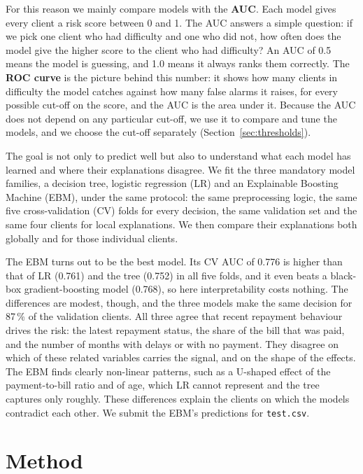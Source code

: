 \documentclass[a4paper,11pt]{article}
\begin{document}
For this reason we mainly compare models with the \textbf{AUC}. Each model gives every client a risk score between 0 and 1. The AUC answers a simple question: if we pick one client who had difficulty and one who did not, how often does the model give the higher score to the client who had difficulty? An AUC of 0.5 means the model is guessing, and 1.0 means it always ranks them correctly. The \textbf{ROC curve} is the picture behind this number: it shows how many clients in difficulty the model catches against how many false alarms it raises, for every possible cut-off on the score, and the AUC is the area under it. Because the AUC does not depend on any particular cut-off, we use it to compare and tune the models, and we choose the cut-off separately (Section~\ref{sec:thresholds}).

The goal is not only to predict well but also to understand what each model has learned and where their explanations disagree. We fit the three mandatory model families, a decision tree, logistic regression (LR) and an Explainable Boosting Machine (EBM), under the same protocol: the same preprocessing logic, the same five cross-validation (CV) folds for every decision, the same validation set and the same four clients for local explanations. We then compare their explanations both globally and for those individual clients.

The EBM turns out to be the best model. Its CV AUC of 0.776 is higher than that of LR (0.761) and the tree (0.752) in all five folds, and it even beats a black-box gradient-boosting model (0.768), so here interpretability costs nothing. The differences are modest, though, and the three models make the same decision for 87\,\% of the validation clients. All three agree that recent repayment behaviour drives the risk: the latest repayment status, the share of the bill that was paid, and the number of months with delays or with no payment. They disagree on which of these related variables carries the signal, and on the shape of the effects. The EBM finds clearly non-linear patterns, such as a U-shaped effect of the payment-to-bill ratio and of age, which LR cannot represent and the tree captures only roughly. These differences explain the clients on which the models contradict each other. We submit the EBM's predictions for \texttt{test.csv}.

\section{Method}
\end{document}
